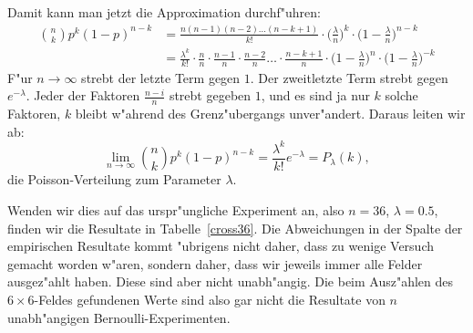 Damit kann man jetzt die Approximation durchf"uhren:
\begin{align*}
\binom{n}{k}p^k(1-p)^{n-k}
&=
\frac{n(n-1)(n-2)\dots(n-k+1)}{k!}\cdot \biggl(\frac{\lambda}n\biggr)^k\cdot \biggl(1-\frac{\lambda}n\biggr)^{n-k}\\
&=
\frac{\lambda^k}{k!}
\cdot\frac{n}{n}
\cdot\frac{n-1}{n}
\cdot\frac{n-2}{n}
\dots
\cdot\frac{n-k+1}{n}
\cdot
\biggl(1-\frac{\lambda}n\biggr)^n
\cdot
\biggl(1-\frac{\lambda}n\biggr)^{-k}
\end{align*}
F"ur $n\to\infty$ strebt der letzte Term gegen $1$.
Der zweitletzte Term strebt gegen $e^{-\lambda}$.
Jeder der Faktoren $\frac{n-i}n$ strebt gegeben $1$, und es sind ja nur
$k$ solche Faktoren, $k$ bleibt w"ahrend des Grenz"ubergangs unver"andert.
Daraus leiten wir ab:
\[
\lim_{n\to\infty} 
\binom{n}{k}p^k(1-p)^{n-k}
=
\frac{\lambda^k}{k!}e^{-\lambda}=P_{\lambda}(k),
\]
die Poisson-Verteilung zum Parameter $\lambda$.

Wenden wir dies auf das urspr"ungliche Experiment an, also $n=36$,
$\lambda=0.5$, finden wir die Resultate in Tabelle~\ref{cross36}. 
Die Abweichungen in der Spalte der empirischen Resultate kommt "ubrigens
nicht daher, dass zu wenige Versuch gemacht worden w"aren, sondern daher,
dass wir jeweils immer alle Felder ausgez"ahlt haben.
Diese sind aber nicht
unabh"angig.
Die beim Ausz"ahlen des $6\times 6$-Feldes gefundenen Werte
sind also gar nicht die Resultate von $n$ unabh"angigen Bernoulli-Experimenten.
